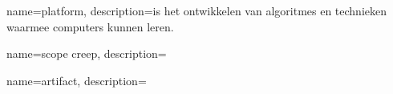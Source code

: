 {
    name=platform,
    description={is het ontwikkelen van algoritmes en technieken waarmee computers kunnen leren.}
}

{
    name=scope creep,
    description={}
}

{
    name=artifact,
    description={}
}